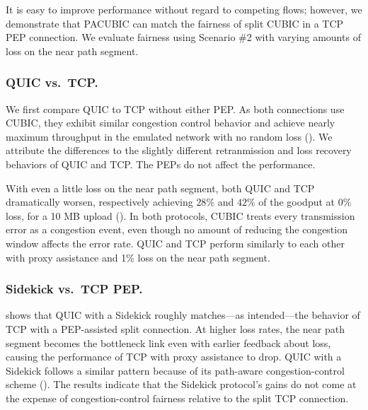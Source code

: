 It is easy to improve performance without regard to competing flows;
however, we demonstrate that PACUBIC can
match the fairness of split CUBIC in a TCP PEP connection\@.
We evaluate fairness using Scenario \#2 with varying amounts of loss on the
near path segment.

\subsubsection{QUIC vs.\ TCP\@.}
We first compare QUIC to TCP without either PEP\@.
As both connections use CUBIC, they exhibit similar
congestion control behavior and achieve nearly maximum throughput in the
emulated network with no random loss ().
We attribute the differences to the slightly different retranmission and
loss recovery behaviors of QUIC and TCP\@. The PEPs do not affect the
performance.

With even a little loss on the near path segment, both QUIC and TCP dramatically
worsen, respectively achieving $28\%$ and $42\%$ of the goodput at $0\%$ loss,
for a 10 MB upload ().
In both protocols, CUBIC treats every transmission error as a congestion event,
even though no amount of reducing the congestion window affects the error rate.
QUIC and TCP perform similarly to each other with proxy assistance and 1\%
loss on the near path segment.

\subsubsection{Sidekick vs.\ TCP PEP\@.}

 shows that QUIC with a Sidekick roughly
matches---as intended---the behavior of TCP with a PEP-assisted split
connection. At higher loss rates, the near path segment becomes the bottleneck
link even with earlier feedback about loss, causing the performance of TCP with
proxy assistance to drop. QUIC with a Sidekick follows a similar pattern
because of its path-aware congestion-control scheme
(). The results indicate that the Sidekick
protocol's gains do not come at the expense of congestion-control fairness
relative to the split TCP connection.
